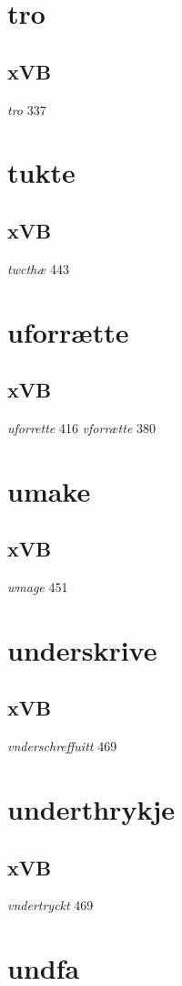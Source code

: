 \documentclass[a4paper,twocolumn]{article}
\begin{document}
\section{tro}
\label{sec:org0f7b104}
\subsection{xVB}
\label{sec:org5569964}
\emph{tro} 337 
\section{tukte}
\label{sec:org04e6c00}
\subsection{xVB}
\label{sec:orgd9a0c29}
\emph{twcthæ} 443 
\section{uforrætte}
\label{sec:orge4cf6fa}
\subsection{xVB}
\label{sec:orgc321821}
\emph{uforrette} 416 \emph{vforrætte} 380 
\section{umake}
\label{sec:org55d6586}
\subsection{xVB}
\label{sec:org2c72636}
\emph{wmage} 451 
\section{underskrive}
\label{sec:org4ad7b60}
\subsection{xVB}
\label{sec:orgfbcbcb6}
\emph{vnderschreffuitt} 469 
\section{underthrykje}
\label{sec:orge839418}
\subsection{xVB}
\label{sec:org205447a}
\emph{vndertryckt} 469 
\section{undfa}
\label{sec:org5dcceae}
\end{document}
